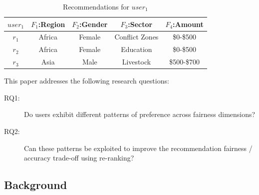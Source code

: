 \begin{table}[tbh]\centering
    \begin{tabular}{|c|c|c|c|c|}
    \hline
        $user_{1}$ & $F_{1}$:Region & $F_{2}$:Gender & $F_{3}$:Sector & $F_{4}$:Amount \\
    \hline
        $r_{1}$ & Africa & Female & Conflict Zones & \$0-\$500\\
    \hline
        $r_{2}$ & Africa & Female & Education & \$0-\$500\\
    \hline \rowcolor[gray]{0.7}
        $r_{3}$ & Asia & Male & Livestock & \$500-\$700\\
    \hline
    \end{tabular}
    \caption{Recommendations for $user_{1}$}
    \label{table_user_recoms}
\end{table}


This paper addresses the following research questions:
\begin{description}
    \item [RQ1:] Do users exhibit different patterns of preference across fairness dimensions?
    \item [RQ2:] Can these patterns be exploited to improve the recommendation fairness / accuracy trade-off using re-ranking?
\end{description}

\subsection{\textbf{Background}}
\label{subsec:ofair_backgroundd}

